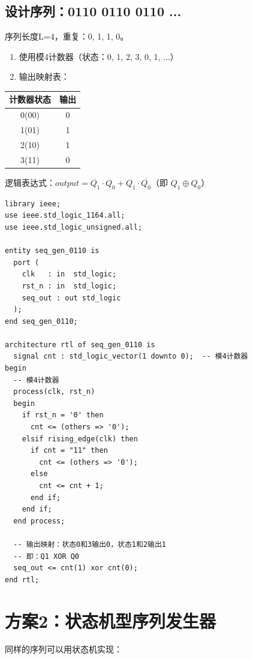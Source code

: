 \subsection{设计序列：0110 0110 0110 ...}

序列长度L=4，重复：0, 1, 1, 0。

\begin{enumerate}
  \item 使用模4计数器（状态：0, 1, 2, 3, 0, 1, ...）
  \item 输出映射表：
\end{enumerate}

\begin{center}
\begin{tabular}{|c|c|}
\hline
\textbf{计数器状态} & \textbf{输出} \\
\hline
0(00) & 0 \\
1(01) & 1 \\
2(10) & 1 \\
3(11) & 0 \\
\hline
\end{tabular}
\end{center}

逻辑表达式：$output = \overline{Q_1} \cdot Q_0 + Q_1 \cdot \overline{Q_0}$（即 $Q_1 \oplus Q_0$）

\begin{lstlisting}[caption={序列0110发生器（计数器+组合逻辑）}]
library ieee;
use ieee.std_logic_1164.all;
use ieee.std_logic_unsigned.all;

entity seq_gen_0110 is
  port (
    clk   : in  std_logic;
    rst_n : in  std_logic;
    seq_out : out std_logic
  );
end seq_gen_0110;

architecture rtl of seq_gen_0110 is
  signal cnt : std_logic_vector(1 downto 0);  -- 模4计数器
begin
  -- 模4计数器
  process(clk, rst_n)
  begin
    if rst_n = '0' then
      cnt <= (others => '0');
    elsif rising_edge(clk) then
      if cnt = "11" then
        cnt <= (others => '0');
      else
        cnt <= cnt + 1;
      end if;
    end if;
  end process;

  -- 输出映射：状态0和3输出0，状态1和2输出1
  -- 即：Q1 XOR Q0
  seq_out <= cnt(1) xor cnt(0);
end rtl;
\end{lstlisting}

\section{方案2：状态机型序列发生器}

同样的序列可以用状态机实现：

